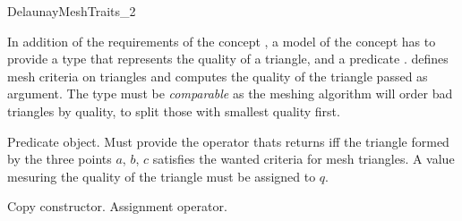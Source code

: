 \begin{ccRefConcept}{DelaunayMeshTraits_2}

\ccDefinition

In addition of the requirements of the concept
, a model of the concept
\ccRefName{} has to provide a type  that represents the
quality of a triangle, and a predicate .  defines
mesh criteria on triangles and computes the quality of the triangle passed
as argument. The type  must be \emph{comparable} as the
meshing algorithm will order bad triangles by quality, to split those with
smallest quality first.

\ccRefines


\ccTypes


 {Predicate object. Must provide the operator
   thats
  returns  iff the triangle formed by the three points $a$,
  $b$, $c$ satisfies the wanted criteria for mesh triangles. A value
  mesuring the quality of the triangle must be assigned to $q$.}

\ccCreation
{}

\ccGlue
{}
{Copy constructor.}
\ccGlue
{}
{Assignment operator.}



\ccHasModels
{}\\

\end{ccRefConcept}

